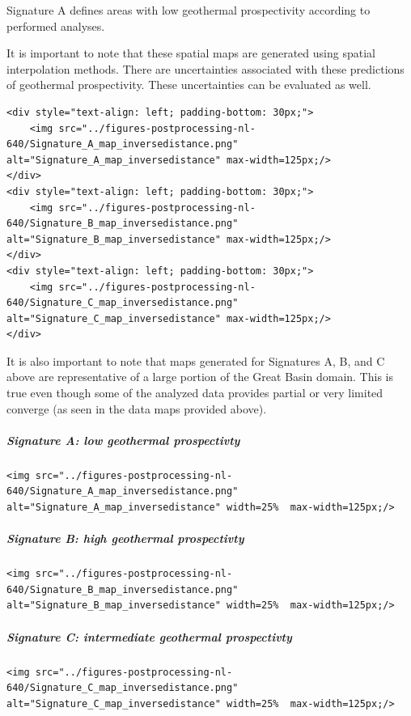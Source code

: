 \documentclass[11pt]{article}
\begin{document}
Signature A defines areas with low geothermal prospectivity according to
performed analyses.

It is important to note that these spatial maps are generated using
spatial interpolation methods. There are uncertainties associated with
these predictions of geothermal prospectivity. These uncertainties can
be evaluated as well.

\begin{verbatim}
<div style="text-align: left; padding-bottom: 30px;">
    <img src="../figures-postprocessing-nl-640/Signature_A_map_inversedistance.png" alt="Signature_A_map_inversedistance" max-width=125px;/>
</div>
<div style="text-align: left; padding-bottom: 30px;">
    <img src="../figures-postprocessing-nl-640/Signature_B_map_inversedistance.png" alt="Signature_B_map_inversedistance" max-width=125px;/>
</div>
<div style="text-align: left; padding-bottom: 30px;">
    <img src="../figures-postprocessing-nl-640/Signature_C_map_inversedistance.png" alt="Signature_C_map_inversedistance" max-width=125px;/>
</div>
\end{verbatim}

It is also important to note that maps generated for Signatures A, B,
and C above are representative of a large portion of the Great Basin
domain. This is true even though some of the analyzed data provides
partial or very limited converge (as seen in the data maps provided
above).

\hypertarget{signature-a-low-geothermal-prospectivty}{%
\subparagraph{Signature A: low geothermal
prospectivty}\label{signature-a-low-geothermal-prospectivty}}

\begin{verbatim}
<img src="../figures-postprocessing-nl-640/Signature_A_map_inversedistance.png" alt="Signature_A_map_inversedistance" width=25%  max-width=125px;/>
\end{verbatim}

\hypertarget{signature-b-high-geothermal-prospectivty}{%
\subparagraph{Signature B: high geothermal
prospectivty}\label{signature-b-high-geothermal-prospectivty}}

\begin{verbatim}
<img src="../figures-postprocessing-nl-640/Signature_B_map_inversedistance.png" alt="Signature_B_map_inversedistance" width=25%  max-width=125px;/>
\end{verbatim}

\hypertarget{signature-c-intermediate-geothermal-prospectivty}{%
\subparagraph{Signature C: intermediate geothermal
prospectivty}\label{signature-c-intermediate-geothermal-prospectivty}}

\begin{verbatim}
<img src="../figures-postprocessing-nl-640/Signature_C_map_inversedistance.png" alt="Signature_C_map_inversedistance" width=25%  max-width=125px;/>
\end{verbatim}


\end{document}
